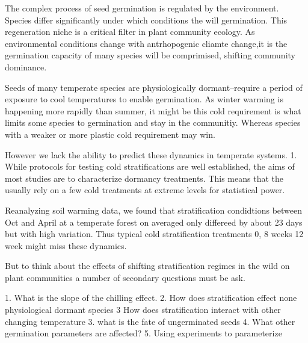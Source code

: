 
The complex process of seed germination is regulated by the environment. Species differ significantly under which conditions the will germination. This regeneration niche is a critical filter in plant community ecology. As environmental conditions change with antrhopogenic cliamte change,it is the germination capacity of many species will be comprimised, shifting community dominance.

Seeds of many temperate species are physiologically dormant--require a period of exposure to cool temperatures to enable germination. As winter warming is happening more rapidly than summer, it might be this cold requirement is what limits some species to germination and stay in the communitiy. Whereas species with a weaker or more plastic cold requirement may win.

However we lack the ability to predict these dynamics in temperate systems. 1. While protocols for testing cold stratifications are well established, the aims of most studies are to characterize dormancy treatments. This means that the usually rely on a few cold treatments at extreme levels for statistical power.

Reanalyzing  soil  warming data, we found that stratification condidtions between Oct and April at a temperate forest on averaged only differeed by about 23 days but with high variation. Thus typical cold stratification treatments 0, 8 weeks 12 week might miss these dynamics.

But to think about the effects of shifting stratification regimes in the wild on plant communities a number of secondary questions must be ask.

1. What is the slope of the chilling effect.
2. How does stratification effect none physiological dormant species
3 How does stratification interact with other changing temperature
3. what is the fate of ungerminated seeds
4. What other germination parameters are affected?
5. Using experiments to parameterize